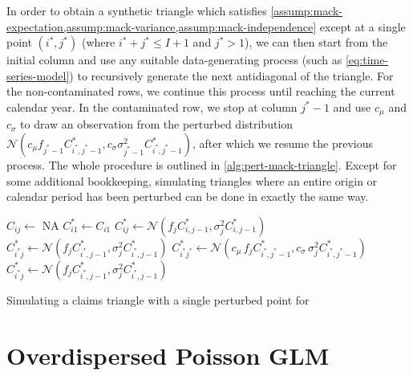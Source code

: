 \documentclass[a4paper]{book}
\begin{document}
In order to obtain a synthetic triangle which satisfies \cref{assump:mack-expectation,assump:mack-variance,assump:mack-independence} except at a single point $(i^*, j^*)$ (where $i^* + j^* \leq I + 1$ and $j^* > 1$), we can then start from the initial column and use any suitable data-generating process (such as \cref{eq:time-series-model}) to recursively generate the next antidiagonal of the triangle. For the non-contaminated rows, we continue this process until reaching the current calendar year. In the contaminated row, we stop at column $j^* - 1$ and use $c_\mu$ and $c_\sigma$ to draw an observation from the perturbed distribution $\mathcal{N}(c_\mu f_{j^* - 1} C^*_{i^*, j^* - 1}, c_\sigma \sigma^2_{j^* - 1} C^*_{i^*, j^* - 1})$, after which we resume the previous process. The whole procedure is outlined in \cref{alg:pert-mack-triangle}. Except for some additional bookkeeping, simulating triangles where an entire origin or calendar period has been perturbed can be done in exactly the same way.

\begin{algorithm}[!htb]
  \begin{algorithmic}
      \State $C_{ij} \gets$ \textsc{NA}
    \EndFor
      \State $C^*_{i1} \gets C_{i1}$
          \State $C^*_{ij} \gets \mathcal{N}(f_j C^*_{i, j - 1}, \sigma_j^2 C^*_{i, j - 1})$
        \EndFor
      \Else
          \State $C^*_{i^*j} \gets \mathcal{N}(f_j C^*_{i^*, j - 1}, \sigma_j^2 C^*_{i^*, j - 1})$
        \EndFor
        \State $C^*_{i^*j^*} \gets \mathcal{N}(c_\mu \, f_j C^*_{i^*, j^* - 1}, c_\sigma \, \sigma_j^2 C^*_{i^*, j^* - 1})$
          \State $C^*_{i^*j} \gets \mathcal{N}(f_j C^*_{i^*, j - 1}, \sigma_j^2 C^*_{i^*, j - 1})$
        \EndFor
      \EndIf
    \EndFor
    \State {}
  \end{algorithmic}
  \caption{Simulating a claims triangle with a single perturbed point for }
  \label{alg:pert-mack-triangle}
\end{algorithm}

\section{Overdispersed Poisson GLM} \label{sec:odp-sim}
\end{document}

